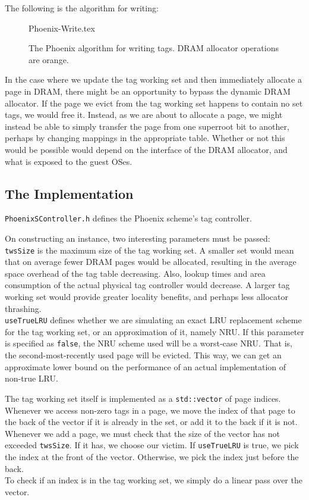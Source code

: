 The following is the algorithm for writing:
\begin{figure}[H]
	\centering
	{Phoenix-Write.tex}
	\caption{The Phoenix algorithm for writing tags. DRAM allocator operations are orange.}
	\label{fig:phw}
\end{figure}

In the case where we update the tag working set and then immediately allocate a page in DRAM, there might be an opportunity to bypass the dynamic DRAM allocator. If the page we evict from the tag working set happens to contain no set tags, we would free it. Instead, as we are about to allocate a page, we might instead be able to simply transfer the page from one superroot bit to another, perhaps by changing mappings in the appropriate table. Whether or not this would be possible would depend on the interface of the DRAM allocator, and what is exposed to the guest OSes.

\subsection{The Implementation}
\texttt{PhoenixSController.h} defines the Phoenix scheme's tag controller.

On constructing an instance, two interesting parameters must be passed:\\
\texttt{twsSize} is the maximum size of the tag working set. A smaller set would mean that on average fewer DRAM pages would be allocated, resulting in the average space overhead of the tag table decreasing. Also, lookup times and area consumption of the actual physical tag controller would decrease. A larger tag working set would provide greater locality benefits, and perhaps less allocator thrashing.\\
\texttt{useTrueLRU} defines whether we are simulating an exact LRU replacement scheme for the tag working set, or an approximation of it, namely NRU. If this parameter is specified as \texttt{false}, the NRU scheme used will be a worst-case NRU. That is, the second-most-recently used page will be evicted. This way, we can get an approximate lower bound on the performance of an actual implementation of non-true LRU.

The tag working set itself is implemented as a \texttt{std::vector} of page indices. Whenever we access non-zero tags in a page, we move the index of that page to the back of the vector if it is already in the set, or add it to the back if it is not.\\
Whenever we add a page, we must check that the size of the vector has not exceeded \texttt{twsSize}. If it has, we choose our victim. If \texttt{useTrueLRU} is true, we pick the index at the front of the vector. Otherwise, we pick the index just before the back.\\
To check if an index is in the tag working set, we simply do a linear pass over the vector.

